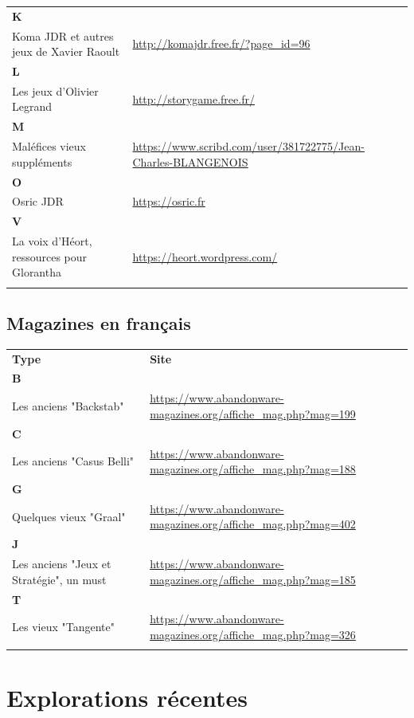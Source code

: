 \documentclass[a4paper, 11pt, twoside]{article}
\begin{document}
\begin{longtable}{p{7cm}p{7cm}}
\textbf{K} & \\
Koma JDR et autres jeux de Xavier Raoult & \url{http://komajdr.free.fr/?page\_id=96}\\
\textbf{L} & \\
Les jeux d'Olivier Legrand & \url{http://storygame.free.fr/}\\
\textbf{M} & \\
Maléfices vieux suppléments & \url{https://www.scribd.com/user/381722775/Jean-Charles-BLANGENOIS}\\
\textbf{O} & \\
Osric JDR & \url{https://osric.fr}\\
\textbf{V} & \\
La voix d'Héort, ressources pour Glorantha & \url{https://heort.wordpress.com/}\\
 & \\
\end{longtable}

\subsection{Magazines en français}
\label{sec:org356f380}

\begin{longtable}{p{7cm}p{7cm}}
\textbf{Type} & \textbf{Site}\\
\textbf{B} & \\
Les anciens "Backstab" & \url{https://www.abandonware-magazines.org/affiche\_mag.php?mag=199}\\
\textbf{C} & \\
Les anciens "Casus Belli" & \url{https://www.abandonware-magazines.org/affiche\_mag.php?mag=188}\\
\textbf{G} & \\
Quelques vieux "Graal" & \url{https://www.abandonware-magazines.org/affiche\_mag.php?mag=402}\\
\textbf{J} & \\
Les anciens "Jeux et Stratégie", un must & \url{https://www.abandonware-magazines.org/affiche\_mag.php?mag=185}\\
\textbf{T} & \\
Les vieux "Tangente" & \url{https://www.abandonware-magazines.org/affiche\_mag.php?mag=326}\\
 & \\
\end{longtable}

\section{Explorations récentes}
\label{sec:org7668530}
\end{document}
